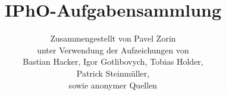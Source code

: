\documentclass[12pt,a4paper]{article}
\title{IPhO-Aufgabensammlung}
\author{Zusammengestellt von Pavel Zorin\\
unter Verwendung der Aufzeichungen von\\
Bastian Hacker, Igor Gotlibovych, Tobias Holder,\\
Patrick Steinmüller,\\
sowie anonymer Quellen}
\begin{document}
\else
\fi
\end{document}
